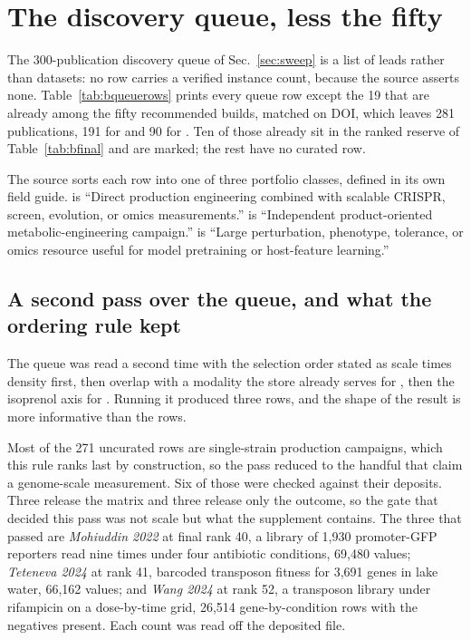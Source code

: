 
\section{The discovery queue, less the fifty}\label{sec:queue}

The 300-publication discovery queue of Sec.~\ref{sec:sweep} is a list of leads rather
than datasets: no row carries a verified instance count, because the source asserts
none. Table~\ref{tab:bqueuerows} prints every queue row except the 19 that are already
among the fifty recommended builds, matched on DOI, which leaves 281 publications, 191
for  and 90 for . Ten of those already sit in the ranked
reserve of Table~\ref{tab:bfinal} and are marked; the rest have no curated row.

The source sorts each row into one of three portfolio classes, defined in its own field
guide.  is ``Direct production engineering combined with scalable CRISPR,
screen, evolution, or omics measurements.''  is ``Independent
product-oriented metabolic-engineering campaign.''  is ``Large
perturbation, phenotype, tolerance, or omics resource useful for model pretraining or
host-feature learning.''

\subsection{A second pass over the queue, and what the ordering rule kept}
\label{sec:queue2}

The queue was read a second time with the selection order stated as scale times density
first, then overlap with a modality the store already serves for , then the
isoprenol axis for . Running it produced three rows, and the shape of the
result is more informative than the rows.

Most of the 271 uncurated rows are single-strain production campaigns, which this rule
ranks last by construction, so the pass reduced to the handful that claim a genome-scale
measurement. Six of those were checked against their deposits. Three release the matrix
and three release only the outcome, so the gate that decided this pass was not scale but
what the supplement contains. The three that passed are
\emph{Mohiuddin 2022} at final rank 40, a library of 1,930 promoter-GFP reporters read
nine times under four antibiotic conditions, 69,480 values; \emph{Teteneva 2024} at rank
41, barcoded transposon fitness for 3,691 genes in lake water, 66,162 values; and
\emph{Wang 2024} at rank 52, a transposon library under rifampicin on a dose-by-time
grid, 26,514 gene-by-condition rows with the negatives present. Each count was read off
the deposited file.

